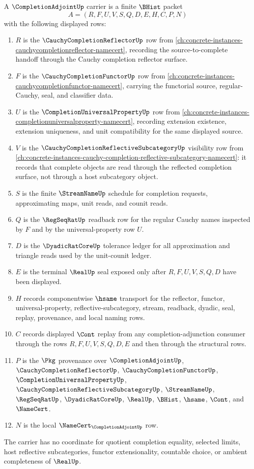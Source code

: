 \begin{definition}
\label{def:completion-adjoint-carrier}
A $\CompletionAdjointUp$ carrier is a finite $\BHist$ packet
$$
A=(R,F,U,V,S,Q,D,E,H,C,P,N)
$$
with the following displayed rows:
\begin{enumerate}
\item $R$ is the $\CauchyCompletionReflectorUp$ row from \autoref{ch:concrete-instances-cauchycompletionreflector-namecert}, recording the source-to-complete handoff through the Cauchy completion reflector surface.
\item $F$ is the $\CauchyCompletionFunctorUp$ row from \autoref{ch:concrete-instances-cauchycompletionfunctor-namecert}, carrying the functorial source, regular-Cauchy, seal, and classifier data.
\item $U$ is the $\CompletionUniversalPropertyUp$ row from \autoref{ch:concrete-instances-completionuniversalproperty-namecert}, recording extension existence, extension uniqueness, and unit compatibility for the same displayed source.
\item $V$ is the $\CauchyCompletionReflectiveSubcategoryUp$ visibility row from \autoref{ch:concrete-instances-cauchy-completion-reflective-subcategory-namecert}: it records that complete objects are read through the reflected completion surface, not through a host subcategory object.
\item $S$ is the finite $\StreamNameUp$ schedule for completion requests, approximating maps, unit reads, and counit reads.
\item $Q$ is the $\RegSeqRatUp$ readback row for the regular Cauchy names inspected by $F$ and by the universal-property row $U$.
\item $D$ is the $\DyadicRatCoreUp$ tolerance ledger for all approximation and triangle reads used by the unit-counit ledger.
\item $E$ is the terminal $\RealUp$ seal exposed only after $R,F,U,V,S,Q,D$ have been displayed.
\item $H$ records componentwise $\hsame$ transport for the reflector, functor, universal-property, reflective-subcategory, stream, readback, dyadic, seal, replay, provenance, and local naming rows.
\item $C$ records displayed $\Cont$ replay from any completion-adjunction consumer through the rows $R,F,U,V,S,Q,D,E$ and then through the structural rows.
\item $P$ is the $\Pkg$ provenance over $\CompletionAdjointUp$, $\CauchyCompletionReflectorUp$, $\CauchyCompletionFunctorUp$, $\CompletionUniversalPropertyUp$, $\CauchyCompletionReflectiveSubcategoryUp$, $\StreamNameUp$, $\RegSeqRatUp$, $\DyadicRatCoreUp$, $\RealUp$, $\BHist$, $\hsame$, $\Cont$, and $\NameCert$.
\item $N$ is the local $\NameCert_{\CompletionAdjointUp}$ row.
\end{enumerate}
The carrier has no coordinate for quotient completion equality, selected limits, host reflective subcategories, functor extensionality, countable choice, or ambient completeness of $\RealUp$.
\end{definition}

